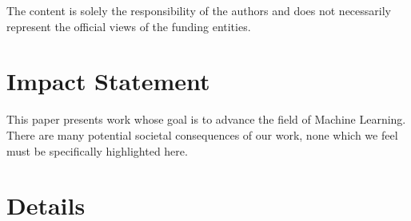 \documentclass{article}
\theoremstyle{plain}
\theoremstyle{definition}
\theoremstyle{remark}
\begin{document}
 The content is solely the responsibility of the authors and does not necessarily represent the official views of the funding entities.

\section*{Impact Statement}
This paper presents work whose goal is to advance the field of Machine Learning. There are many potential societal consequences of our work, none which we feel must be specifically highlighted here.





\newpage
\appendix
\onecolumn
\section{\relbench Details}
\label{app: details}
\end{document}
